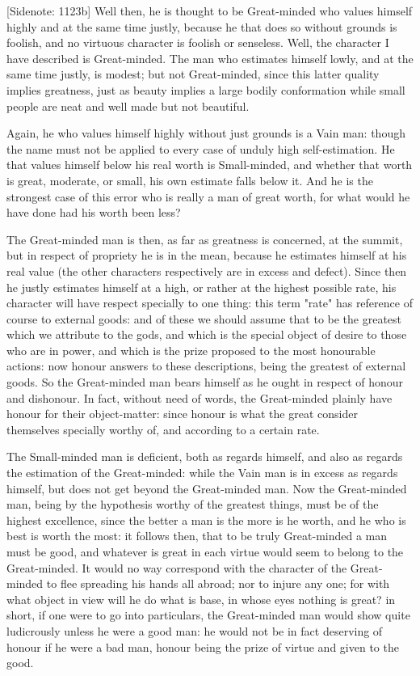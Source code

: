 [Sidenote: 1123b] Well then, he is thought to be Great-minded who values
himself highly and at the same time justly, because he that does so
without grounds is foolish, and no virtuous character is foolish or
senseless. Well, the character I have described is Great-minded. The man
who estimates himself lowly, and at the same time justly, is modest; but
not Great-minded, since this latter quality implies greatness, just as
beauty implies a large bodily conformation while small people are neat
and well made but not beautiful.

Again, he who values himself highly without just grounds is a Vain
man: though the name must not be applied to every case of unduly
high self-estimation. He that values himself below his real worth is
Small-minded, and whether that worth is great, moderate, or small, his
own estimate falls below it. And he is the strongest case of this error
who is really a man of great worth, for what would he have done had his
worth been less?

The Great-minded man is then, as far as greatness is concerned, at
the summit, but in respect of propriety he is in the mean, because he
estimates himself at his real value (the other characters respectively
are in excess and defect). Since then he justly estimates himself at a
high, or rather at the highest possible rate, his character will have
respect specially to one thing: this term "rate" has reference of course
to external goods: and of these we should assume that to be the greatest
which we attribute to the gods, and which is the special object of
desire to those who are in power, and which is the prize proposed to the
most honourable actions: now honour answers to these descriptions, being
the greatest of external goods. So the Great-minded man bears himself as
he ought in respect of honour and dishonour. In fact, without need of
words, the Great-minded plainly have honour for their object-matter:
since honour is what the great consider themselves specially worthy of,
and according to a certain rate.

The Small-minded man is deficient, both as regards himself, and also
as regards the estimation of the Great-minded: while the Vain man is in
excess as regards himself, but does not get beyond the Great-minded
man. Now the Great-minded man, being by the hypothesis worthy of the
greatest things, must be of the highest excellence, since the better a
man is the more is he worth, and he who is best is worth the most: it
follows then, that to be truly Great-minded a man must be good,
and whatever is great in each virtue would seem to belong to the
Great-minded. It would no way correspond with the character of the
Great-minded to flee spreading his hands all abroad; nor to injure any
one; for with what object in view will he do what is base, in whose eyes
nothing is great? in short, if one were to go into particulars, the
Great-minded man would show quite ludicrously unless he were a good man:
he would not be in fact deserving of honour if he were a bad man, honour
being the prize of virtue and given to the good.

